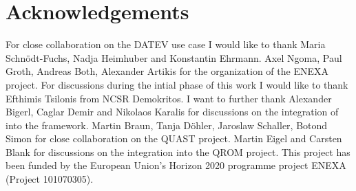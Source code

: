 \chapter{Acknowledgements}

For close collaboration on the DATEV use case I would like to thank Maria Schnödt-Fuchs, Nadja Heimhuber and Konstantin Ehrmann.
Axel Ngoma, Paul Groth, Andreas Both, Alexander Artikis for the organization of the ENEXA project.
For discussions during the intial phase of this work I would like to thank Efthimis Tsilonis from NCSR Demokritos.
I want to further thank Alexander Bigerl, Caglar Demir and Nikolaos Karalis for discussions on the integration of  into the \tnreason framework.
Martin Braun, Tanja Döhler, Jaroslaw Schaller, Botond Simon for close collaboration on the QUAST project.
Martin Eigel and Carsten Blank for discussions on the integration into the QROM project.
This project has been funded by the European Union's Horizon 2020 programme project ENEXA (Project 101070305).